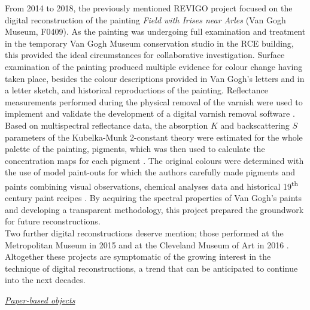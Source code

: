 From 2014 to 2018, the previously mentioned \gls{REVIGO} project focused on the digital reconstruction of the painting \textit{Field with Irises near Arles} (Van Gogh Museum, F0409). As the painting was undergoing full examination and treatment in the temporary Van Gogh Museum conservation studio in the \gls{RCE} building, this provided the ideal circumstances for collaborative investigation. Surface examination of the painting produced multiple evidence for colour change having taken place, besides the colour descriptions provided in Van Gogh’s letters and in a letter sketch, and historical reproductions of the painting. Reflectance measurements performed during the physical removal of the varnish were used to implement and validate the development of a digital varnish removal software \citep{kirchner_digitally_2018}. Based on multispectral reflectance data, the absorption $K$ and backscattering $S$ parameters of the Kubelka-Munk 2-constant theory were estimated for the whole palette of the painting,  pigments, which was then used to calculate the concentration maps for each pigment \citep{kirchner_digitally_2017-1}. The original colours were determined with the use of model paint-outs \citep{kirchner_digitally_2017} for which the authors carefully made pigments and paints combining visual observations, chemical analyses data and historical 19\textsuperscript{th} century paint recipes \citep{geldof_reconstructing_2018}. By acquiring the spectral properties of Van Gogh's paints and developing a transparent methodology, this project prepared the groundwork for future reconstructions.\\

Two further digital reconstructions deserve mention; those performed at the Metropolitan Museum in 2015 and at the Cleveland Museum of Art in 2016 \citep{fieberg_paintings_2017}. Altogether these projects are symptomatic of the growing interest in the technique of digital reconstructions, a trend that can be anticipated to continue into the next decades.\\

\vspace{1cm}

\textit{\underline{Paper-based objects}}


